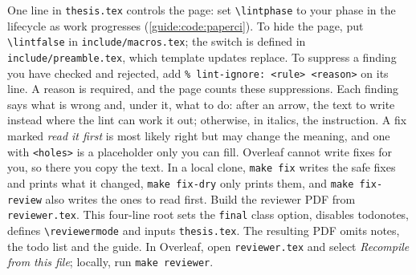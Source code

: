 One line in \texttt{thesis.tex} controls the page: set \texttt{\textbackslash lintphase} to your phase in the lifecycle as work progresses (\cref{guide:code:paperci}). To hide the page, put \texttt{\textbackslash lintfalse} in \texttt{include/macros.tex}; the switch is defined in \texttt{include/preamble.tex}, which template updates replace. To suppress a finding you have checked and rejected, add \texttt{\% lint-ignore: <rule> <reason>} on its line. A reason is required, and the page counts these suppressions.
Each finding says what is wrong and, under it, what to do: after an arrow, the text to write instead where the lint can work it out; otherwise, in italics, the instruction. A fix marked \emph{read it first} is most likely right but may change the meaning, and one with \texttt{<holes>} is a placeholder only you can fill. Overleaf cannot write fixes for you, so there you copy the text. In a local clone, \texttt{make fix} writes the safe fixes and prints what it changed, \texttt{make fix-dry} only prints them, and \texttt{make fix-review} also writes the ones to read first.
Build the reviewer PDF from \texttt{reviewer.tex}. This four-line root sets the \texttt{final} class option, disables todonotes, defines \texttt{\textbackslash reviewermode} and inputs \texttt{thesis.tex}. The resulting PDF omits notes, the todo list and the guide. In Overleaf, open \texttt{reviewer.tex} and select \emph{Recompile from this file}; locally, run \texttt{make reviewer}.

